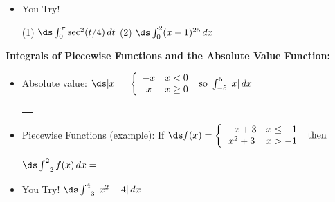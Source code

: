 \documentclass[12pt,letterpaper]{article}
\begin{document}
\begin{itemize}
\item You Try!

(1) $\ds \int_0^{\pi} \sec^2(t/4) \, dt$ \hspace{2in} (2) $\ds \int_0^2 (x-1)^{25} \, dx$

\vfill

\end{itemize}


\noindent\textbf{Integrals of Piecewise Functions and the Absolute Value Function:}

\begin{itemize}

\item Absolute value: $\ds |x| = \left\{ \begin{array}{cl} -x & x< 0 \\ x & x \geq 0 \end{array} \right. \text{   so   } \int_{-5}^5 |x| \, dx = $ \begin{tabular}{l}
\\
\underline{\hspace{2.5in}}
\end{tabular}

\bigskip

\item Piecewise Functions (example): If $\ds f(x) = \left\{ \begin{array}{cl} -x+3 & x \leq -1 \\ x^2 + 3 & x > -1 \end{array} \right. \text{ then }$ 

\medskip

$\ds \int_{-2}^2 f(x) \, dx= $

\vfill
\end{itemize}

\begin{itemize}
\item You Try! $\ds \int_{-3}^4 |x^2 - 4| \, dx$

\vfill


\end{itemize}
\end{document}
